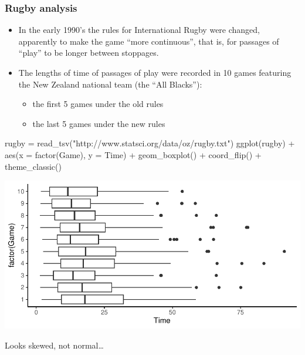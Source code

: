 \documentclass[a4paper]{article}\usepackage[]{graphicx}\usepackage[]{xcolor}
\makeatletter
\def\maxwidth{ %
  \ifdim\Gin@nat@width>\linewidth
    \linewidth
  \else
    \Gin@nat@width
  \fi
}
\makeatother
\begin{document}
\subsubsection{Rugby analysis}
\begin{itemize}
	\item In the early 1990's the rules for International Rugby were changed, apparently to make the game ``more continuous'', that is, for passages of ``play'' to be longer between stoppages.
	\item The lengths of time of passages of play were recorded in 10 games featuring the New Zealand national team (the ``All Blacks''):
	\begin{itemize}
		\item the first 5 games under the old rules
		\item the last 5 games under the new rules
	\end{itemize}
\end{itemize}
\begin{Schunk}
\begin{Sinput}
rugby = read_tsv("http://www.statsci.org/data/oz/rugby.txt")
ggplot(rugby) + aes(x = factor(Game), y = Time) + 
  geom_boxplot() + coord_flip() +
  theme_classic()
\end{Sinput}


{\centering \includegraphics[width=\maxwidth]{figure/listings-unnamed-chunk-268-1} 

}

\end{Schunk}
Looks skewed, not normal\dots
\end{document}
